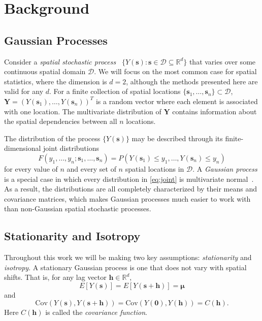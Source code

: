 \chapter{Background} \label{chapter1:Background}

\section{\sloppy Gaussian Processes}

Consider a \emph{spatial stochastic process}~\cite{gelfand2010handbook} $\{Y(\bm{s}): \bm{s} \in \mathcal{D} \subseteq \mathbb{R}^d\}$ that varies over some continuous spatial domain $\mathcal{D}$. We will focus on the most common case for spatial statistics, where the dimension is $d = 2$, although the methods presented here are valid for any $d$.  For a finite collection of spatial locations $\{\bm{s}_1, \dots, \bm{s}_n\} \subset \mathcal{D}$, $\bm{Y} = (Y(\bm{s}_1), \dots, Y(\bm{s}_n))^T$ is a random vector where each element is associated with one location. The multivariate distribution of $\bm{Y}$ contains information about the spatial dependencies between all $n$ locations.

The distribution of the process $\{Y(\bm{s})\}$ may be described through its finite-dimensional joint distributions
\begin{equation} \label{eq:joint}
F(y_1, \dots, y_n; \bm{s}_1, \dots, \bm{s}_n) = P(Y(\bm{s}_1) \leq y_1, \dots, Y(\bm{s}_n) \leq y_n)
\end{equation}
for every value of $n$ and every set of $n$ spatial locations in $\mathcal{D}$. A \emph{Gaussian process} is a special case in which every distribution in \eqref{eq:joint} is multivariate normal~\cite{gelfand2010handbook}. As a result, the distributions are all completely characterized by their means and covariance matrices, which makes Gaussian processes much easier to work with than non-Gaussian spatial stochastic processes.


\section{Stationarity and Isotropy} %
\label{sec:stationarity_and_isotropy}

Throughout this work we will be making two key assumptions:  \emph{stationarity} and \emph{isotropy}. A stationary Gaussian process is one that does not vary with spatial shifts. That is, for any lag vector $\bm{h} \in \mathbb{R}^d$,
\[
E[Y(\bm{s})] = E[Y(\bm{s} + \bm{h})] = \bm{\mu}
\]
and
\[
\textrm{Cov}(Y(\bm{s}), Y(\bm{s} + \bm{h})) = \textrm{Cov}(Y(\bm{0}), Y(\bm{h})) = C(\bm{h}).
\]
Here $C(\bm{h})$ is called the \emph{covariance function}.

